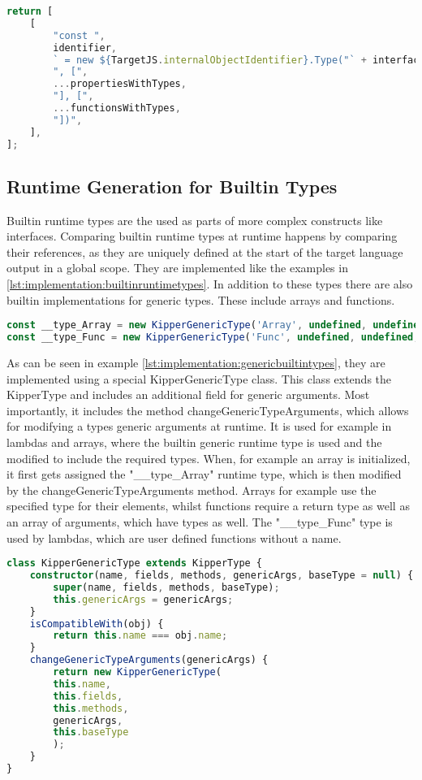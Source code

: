 \begin{lstlisting}[language=Typescript,caption=Code generation statement ,label=lst:implementation:codegenerationstatement]
return [
	[
		"const ",
		identifier,
		` = new ${TargetJS.internalObjectIdentifier}.Type("` + interfaceName + '"',
		", [",
		...propertiesWithTypes,
		"], [",
		...functionsWithTypes,
		"])",
	],
];
\end{lstlisting}

\subsection{Runtime Generation for Builtin Types}
Builtin runtime types are the used as parts of more complex constructs like interfaces. Comparing builtin runtime types at runtime happens by comparing their references, as they are uniquely defined at the start of the target language output in a global scope. They are implemented like the examples in  \ref{lst:implementation:builtinruntimetypes}. In addition to these types there are also builtin implementations for generic types. These include arrays and functions.

\begin{lstlisting}[language=Typescript,caption=Generic builtin types,label=lst:implementation:genericbuiltintypes]
const __type_Array = new KipperGenericType('Array', undefined, undefined, {T: __type_any});
const __type_Func = new KipperGenericType('Func', undefined, undefined, {T: [], R: __type_any});	
\end{lstlisting}

As can be seen in example \ref{lst:implementation:genericbuiltintypes}, they are implemented using a special KipperGenericType class. This class extends the KipperType and includes an additional field for generic arguments. Most importantly, it includes the method changeGenericTypeArguments, which allows for modifying a types generic arguments at runtime. It is used for example in lambdas and arrays, where the builtin generic runtime type is used and the modified to include the required types. When, for example an array is initialized, it first gets assigned the "\_\_type\_Array" runtime type, which is then modified by the changeGenericTypeArguments method. Arrays for example use the specified type for their elements, whilst functions require a return type as well as an array of arguments, which have types as well. The "\_\_type\_Func" type is used by lambdas, which are user defined functions without a name.

\begin{lstlisting}[language=Typescript,caption=Generic Kipper Type,label=lst:implementation:generickippertype]
class KipperGenericType extends KipperType {
	constructor(name, fields, methods, genericArgs, baseType = null) {
		super(name, fields, methods, baseType);
		this.genericArgs = genericArgs;
	}
	isCompatibleWith(obj) {
		return this.name === obj.name;
	}
	changeGenericTypeArguments(genericArgs) {
		return new KipperGenericType(
		this.name,
		this.fields,
		this.methods,
		genericArgs,
		this.baseType
		);
	}
}
\end{lstlisting}

